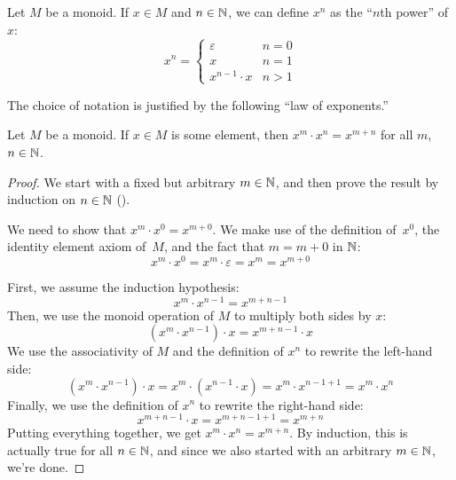 \documentclass[../generics]{subfiles}
\begin{document}
\begin{definition}
Let $M$ be a monoid. If $x\in M$ and $n\in\mathbb{N}$, we can define $x^n$ as the ``$n$th power'' of $x$:
\[
x^n = \begin{cases}
\varepsilon&n=0\\
x&n=1\\
x^{n-1}\cdot x&n>1
\end{cases}
\]
\end{definition}
The choice of notation is justified by the following ``law of exponents.''
\begin{proposition}\label{monoid exp law}
Let $M$ be a monoid. If $x\in M$ is some element, then $x^m\cdot x^n=x^{m+n}$ for all $m$, $n\in\mathbb{N}$.
\end{proposition}
\begin{proof}
We start with a fixed but arbitrary $m\in\mathbb{N}$, and then prove the result by induction on $n\in\mathbb{N}$ ().

\BaseCase We need to show that $x^m\cdot x^0=x^{m+0}$. We make use of the definition of~$x^0$, the identity element axiom of~$M$, and the fact that $m=m+0$ in $\mathbb{N}$:
\[x^m\cdot x^0=x^m\cdot\varepsilon=x^{m}=x^{m+0}\]

\InductiveStep First, we assume the induction hypothesis:
\[x^m\cdot x^{n-1}=x^{m+n-1}\]
Then, we use the monoid operation of $M$ to multiply both sides by $x$:
\[(x^m\cdot x^{n-1})\cdot x =x^{m+n-1}\cdot x\]
We use the associativity of $M$ and the definition of $x^n$ to rewrite the left-hand side:
\[
(x^m\cdot x^{n-1})\cdot x = x^m\cdot (x^{n-1}\cdot x) = x^m\cdot x^{n-1+1}=x^m\cdot x^n
\]
Finally, we use the definition of $x^n$ to rewrite the right-hand side:
\[
x^{m+n-1}\cdot x = x^{m+n-1+1}=x^{m+n}
\]
Putting everything together, we get $x^m\cdot x^n=x^{m+n}$. By induction, this is actually true for all $n\in\mathbb{N}$, and since we also started with an arbitrary $m\in\mathbb{N}$, we're done.
\end{proof}
\end{document}
